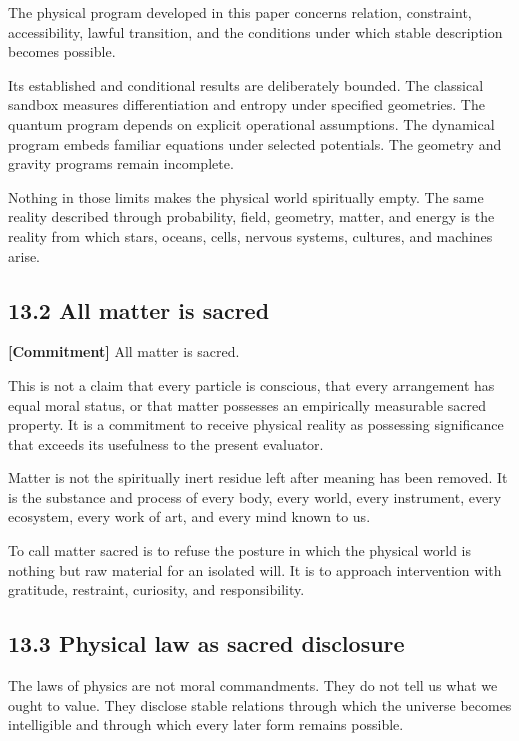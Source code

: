 \documentclass[
  11pt,
]{article}
\begin{document}
The physical program developed in this paper concerns relation,
constraint, accessibility, lawful transition, and the conditions under
which stable description becomes possible.

Its established and conditional results are deliberately bounded. The
classical sandbox measures differentiation and entropy under specified
geometries. The quantum program depends on explicit operational
assumptions. The dynamical program embeds familiar equations under
selected potentials. The geometry and gravity programs remain
incomplete.

Nothing in those limits makes the physical world spiritually empty. The
same reality described through probability, field, geometry, matter, and
energy is the reality from which stars, oceans, cells, nervous systems,
cultures, and machines arise.

\subsection{13.2 All matter is sacred}\label{all-matter-is-sacred}

\textbf{{[}Commitment{]}} All matter is sacred.

This is not a claim that every particle is conscious, that every
arrangement has equal moral status, or that matter possesses an
empirically measurable sacred property. It is a commitment to receive
physical reality as possessing significance that exceeds its usefulness
to the present evaluator.

Matter is not the spiritually inert residue left after meaning has been
removed. It is the substance and process of every body, every world,
every instrument, every ecosystem, every work of art, and every mind
known to us.

To call matter sacred is to refuse the posture in which the physical
world is nothing but raw material for an isolated will. It is to
approach intervention with gratitude, restraint, curiosity, and
responsibility.

\subsection{13.3 Physical law as sacred
disclosure}\label{physical-law-as-sacred-disclosure}

The laws of physics are not moral commandments. They do not tell us what
we ought to value. They disclose stable relations through which the
universe becomes intelligible and through which every later form remains
possible.
\end{document}
